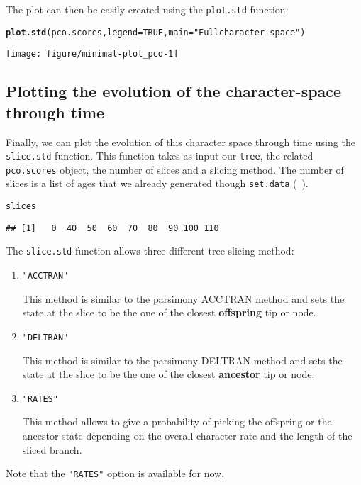\documentclass[a4paper,11pt]{article}\usepackage[]{graphicx}\usepackage[]{color}
\makeatletter
\def\maxwidth{ %
  \ifdim\Gin@nat@width>\linewidth
    \linewidth
  \else
    \Gin@nat@width
  \fi
}
\newcommand{\hlnum}[1]{\textcolor[rgb]{0.686,0.059,0.569}{#1}}%
\newcommand{\hlstr}[1]{\textcolor[rgb]{0.192,0.494,0.8}{#1}}%
\newcommand{\hlstd}[1]{\textcolor[rgb]{0.345,0.345,0.345}{#1}}%
\newcommand{\hlkwc}[1]{\textcolor[rgb]{0.333,0.667,0.333}{#1}}%
\newcommand{\hlkwd}[1]{\textcolor[rgb]{0.737,0.353,0.396}{\textbf{#1}}}%
\newenvironment{kframe}{%
 \def\at@end@of@kframe{}%
 \ifinner\ifhmode%
  \def\at@end@of@kframe{\end{minipage}}%
  \begin{minipage}{\columnwidth}%
 \fi\fi%
 \def\FrameCommand##1{\hskip\@totalleftmargin \hskip-\fboxsep
 \colorbox{shadecolor}{##1}\hskip-\fboxsep
     \hskip-\linewidth \hskip-\@totalleftmargin \hskip\columnwidth}%
 \MakeFramed {\advance\hsize-\width
   \@totalleftmargin\z@ \linewidth\hsize
   \@setminipage}}%
 {\par\unskip\endMakeFramed%
 \at@end@of@kframe}
\newenvironment{knitrout}{}{} %
\makeatother
\begin{document}
The plot can then be easily created using the \texttt{plot.std} function:

\begin{knitrout}
\color{fgcolor}\begin{kframe}
\begin{alltt}
\hlkwd{plot.std}\hlstd{(pco.scores,} \hlkwc{legend}\hlstd{=}\hlnum{TRUE}\hlstd{,} \hlkwc{main}\hlstd{=}\hlstr{"Full character-space"}\hlstd{)}
\end{alltt}
\end{kframe}

{\centering \texttt{[image: figure/minimal-plot\_pco-1]} 

}



\end{knitrout}

\subsection{Plotting the evolution of the character-space through time}
Finally, we can plot the evolution of this character space through time using the \texttt{slice.std} function.
This function takes as input our \texttt{tree}, the related \texttt{pco.scores} object, the number of slices and a slicing method.
The number of slices is a list of ages that we already generated though \texttt{set.data} (~\label{data}).

\begin{knitrout}
\color{fgcolor}\begin{kframe}
\begin{alltt}
\hlstd{slices}
\end{alltt}
\begin{verbatim}
## [1]   0  40  50  60  70  80  90 100 110
\end{verbatim}
\end{kframe}
\end{knitrout}

The \texttt{slice.std} function allows three different tree slicing method:
\begin{enumerate}
\item{\texttt{"ACCTRAN"}}

This method is similar to the parsimony ACCTRAN method and sets the state at the slice to be the one of the closest \textbf{offspring} tip or node.
\item{\texttt{"DELTRAN"}}

This method is similar to the parsimony DELTRAN method and sets the state at the slice to be the one of the closest \textbf{ancestor} tip or node.
\item{\texttt{"RATES"}}

This method allows to give a probability of picking the offspring or the ancestor state depending on the overall character rate and the length of the sliced branch.
\end{enumerate}
Note that the \texttt{"RATES"} option is available for now.
\end{document}
